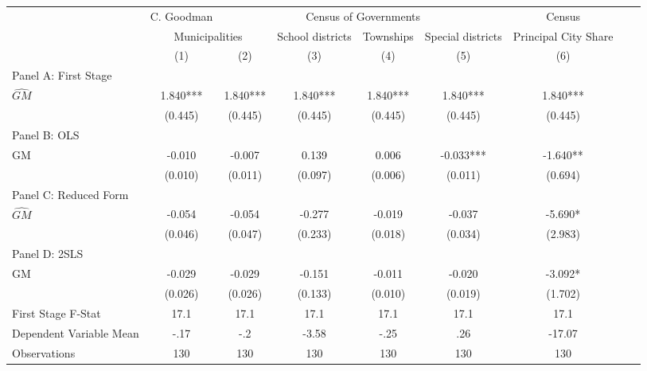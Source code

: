  \begin{tabular}{l*{8}{c}} \toprule
&\multicolumn{1}{c}{C. Goodman}&\multicolumn{4}{c}{Census of Governments}&\multicolumn{1}{c}{Census}\\\cmidrule(lr){2-2}\cmidrule(lr){3-6}\cmidrule(lr){7-7}
&\multicolumn{2}{c}{Municipalities}&\multicolumn{1}{c}{School districts}&\multicolumn{1}{c}{Townships}&\multicolumn{1}{c}{Special districts}&\multicolumn{1}{c}{Principal City Share}\\\cmidrule(lr){2-3}\cmidrule(lr){4-6}\cmidrule(lr){7-7}
&\multicolumn{1}{c}{(1)}&\multicolumn{1}{c}{(2)}&\multicolumn{1}{c}{(3)}&\multicolumn{1}{c}{(4)}&\multicolumn{1}{c}{(5)}&\multicolumn{1}{c}{(6)}\\
\cmidrule(lr){1-7}
\multicolumn{6}{l}{Panel A: First Stage}\\
\cmidrule(lr){1-7}
$\widehat{GM}$  &    1.840***&    1.840***&    1.840***&    1.840***&    1.840***&    1.840***\\
                &  (0.445)   &  (0.445)   &  (0.445)   &  (0.445)   &  (0.445)   &  (0.445)   \\
\cmidrule(lr){1-7}
\multicolumn{6}{l}{Panel B: OLS}\\
\cmidrule(lr){1-7}
GM              &   -0.010   &   -0.007   &    0.139   &    0.006   &   -0.033***&   -1.640** \\
                &  (0.010)   &  (0.011)   &  (0.097)   &  (0.006)   &  (0.011)   &  (0.694)   \\
\cmidrule(lr){1-7}
\multicolumn{6}{l}{Panel C: Reduced Form}\\
\cmidrule(lr){1-7}
$\widehat{GM}$  &   -0.054   &   -0.054   &   -0.277   &   -0.019   &   -0.037   &   -5.690*  \\
                &  (0.046)   &  (0.047)   &  (0.233)   &  (0.018)   &  (0.034)   &  (2.983)   \\
\cmidrule(lr){1-7}
\multicolumn{6}{l}{Panel D: 2SLS}\\
\cmidrule(lr){1-7}
GM              &   -0.029   &   -0.029   &   -0.151   &   -0.011   &   -0.020   &   -3.092*  \\
                &  (0.026)   &  (0.026)   &  (0.133)   &  (0.010)   &  (0.019)   &  (1.702)   \\
\midrule
First Stage F-Stat&     17.1   &     17.1   &     17.1   &     17.1   &     17.1   &     17.1   \\
Dependent Variable Mean&     -.17   &      -.2   &    -3.58   &     -.25   &      .26   &   -17.07   \\
Observations    &      130   &      130   &      130   &      130   &      130   &      130   \\
       \bottomrule \end{tabular}

